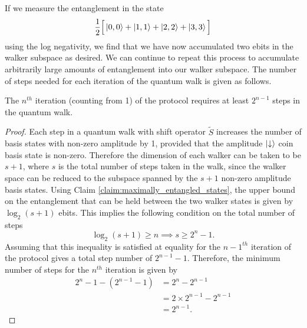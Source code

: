 If we measure the entanglement in the state
\begin{equation}
    \frac{1}{2}\Big[\ket{0,0} + \ket{1,1} + \ket{2,2} + \ket{3,3}\Big ]
\end{equation}
using the log negativity, we find that we have now accumulated two ebits in the walker subspace as desired.
We can continue to repeat this process to accumulate arbitrarily large amounts of entanglement into our walker subspace. The number of steps needed for each iteration of the quantum walk is given as follows.
\begin{claim}
\label{claim:min_steps}
The $n^{th}$ iteration (counting from 1) of the protocol requires at least $2^{n-1}$ steps in the quantum walk.
\end{claim}
\begin{proof}
Each step in a quantum walk with shift operator $\tilde{S}$ increases the number of basis states with non-zero amplitude by 1, provided that the amplitude $\ket{\downarrow}$ coin basis state is non-zero.
Therefore the dimension of each walker can be taken to be $s + 1$, where $s$ is the total number of steps taken in the walk, since the walker space can be reduced to the subspace spanned by the $s+1$ non-zero amplitude basis states.
Using Claim \ref{claim:maximally_entangled_states}, the upper bound on the entanglement that can be held between the two walker states is given by $\log_2(s+1)$ ebits.
This implies the following condition on the total number of steps
\begin{equation}
    \log_2(s+1) \geq n \implies s\geq 2^n -1.
\end{equation}
Assuming that this inequality is satisfied at equality for the $n-1^{th}$ iteration of the protocol gives a total step number of $2^{n-1} -1$.
Therefore, the minimum number of steps for the $n^{th}$ iteration is given by
\begin{align}
    2^{n} - 1 - (2^{n-1} -1) &= 2^n - 2^{n-1}\\
    &= 2 \times 2^{n-1} - 2^{n-1}\\
    &= 2^{n-1}.
\end{align}
\end{proof}
